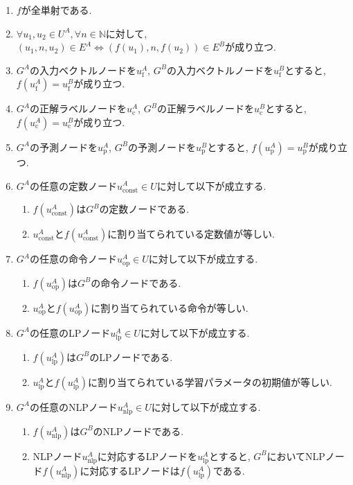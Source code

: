 \documentclass[11pt,oneside,openany,report]{jsbook}
\begin{document}
\begin{enumerate}
  \item $f$が全単射である.
  \item $ \forall u_1, u_2 \in U^A, \forall n \in \mathbb{N} $に対して, $ (u_1, n, u_2) \in E^A \Leftrightarrow (f(u_1), n, f(u_2)) \in E^B $が成り立つ.
  \item $G^A$の入力ベクトルノードを$u_{\mathrm{f}}^A$, $G^B$の入力ベクトルノードを$u_{\mathrm{f}}^B$とすると, $f(u_{\mathrm{f}}^A) = u_{\mathrm{f}}^B$が成り立つ.
  \item $G^A$の正解ラベルノードを$u_\mathrm{c}^A$, $G^B$の正解ラベルノードを$u_\mathrm{c}^B$とすると, $f(u_\mathrm{c}^A) = u_\mathrm{c}^B$が成り立つ.
  \item $G^A$の予測ノードを$u_\mathrm{p}^A$, $G^B$の予測ノードを$u_\mathrm{p}^B$とすると, $f(u_\mathrm{p}^A) = u_\mathrm{p}^B$が成り立つ.
  \item $G^A$の任意の定数ノード$ u_\mathrm{const}^A \in U $に対して以下が成立する.
  \begin{enumerate}
    \item $f(u_\mathrm{const}^A)$は$G^B$の定数ノードである.
    \item $u_\mathrm{const}^A$と$f(u_\mathrm{const}^A)$に割り当てられている定数値が等しい.
  \end{enumerate}
  \item $G^A$の任意の命令ノード$u_\mathrm{op}^A \in U $に対して以下が成立する.
  \begin{enumerate}
    \item $f(u_\mathrm{op}^A)$は$G^B$の命令ノードである.
    \item $u_\mathrm{op}^A$と$f(u_\mathrm{op}^A)$に割り当てられている命令が等しい.
  \end{enumerate}
  \item $G^A$の任意のLPノード$u_\mathrm{lp}^A \in U $に対して以下が成立する.
  \begin{enumerate}
    \item $f(u_\mathrm{lp}^A)$は$G^B$のLPノードである.
    \item $u_\mathrm{lp}^A$と$f(u_\mathrm{lp}^A)$に割り当てられている学習パラメータの初期値が等しい.
  \end{enumerate}
  \item $G^A$の任意のNLPノード$u_\mathrm{nlp}^A \in U $に対して以下が成立する.
  \begin{enumerate}
    \item $f(u_\mathrm{nlp}^A)$は$G^B$のNLPノードである.
    \item NLPノード$u_\mathrm{nlp}^A$に対応するLPノードを$u_\mathrm{lp}^A$とすると, $G^B$においてNLPノード$f(u_\mathrm{nlp}^A)$に対応するLPノードは$f(u_\mathrm{lp}^A)$である.
  \end{enumerate}
\end{enumerate}
\end{document}
